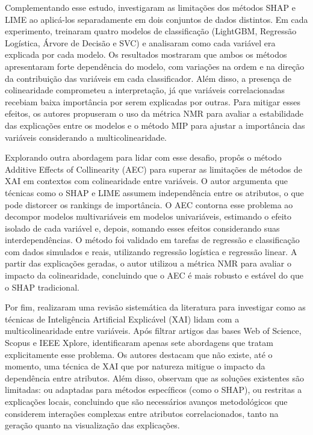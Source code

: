 Complementando esse estudo,  investigaram as limitações dos métodos SHAP e LIME ao aplicá-los separadamente em dois conjuntos de dados distintos. Em cada experimento, treinaram quatro modelos de classificação (LightGBM, Regressão Logística, Árvore de Decisão e SVC) e analisaram como cada variável era explicada por cada modelo. Os resultados mostraram que ambos os métodos apresentaram forte dependência do modelo, com variações na ordem e na direção da contribuição das variáveis em cada classificador. Além disso, a presença de colinearidade comprometeu a interpretação, já que variáveis correlacionadas recebiam baixa importância por serem explicadas por outras. Para mitigar esses efeitos, os autores propuseram o uso da métrica NMR para avaliar a estabilidade das explicações entre os modelos e o método MIP para ajustar a importância das variáveis considerando a multicolinearidade. 

Explorando outra abordagem para lidar com esse desafio,  propôs o método Additive Effects of Collinearity (AEC) para superar as limitações de métodos de XAI em contextos com colinearidade entre variáveis. O autor argumenta que técnicas como o SHAP e LIME assumem independência entre os atributos, o que pode distorcer os rankings de importância. O AEC contorna esse problema ao decompor modelos multivariáveis em modelos univariáveis, estimando o efeito isolado de cada variável e, depois, somando esses efeitos considerando suas interdependências. O método foi validado em tarefas de regressão e classificação com dados simulados e reais, utilizando regressão logística e regressão linear. A partir das explicações geradas, o autor utilizou a métrica NMR para avaliar o impacto da colinearidade, concluindo que o AEC é mais robusto e estável do que o SHAP tradicional.

Por fim,  realizaram uma revisão sistemática da literatura para investigar como as técnicas de Inteligência Artificial Explicável (XAI) lidam com a multicolinearidade entre variáveis. Após filtrar artigos das bases Web of Science, Scopus e IEEE Xplore, identificaram apenas sete abordagens que tratam explicitamente esse problema. Os autores destacam que não existe, até o momento, uma técnica de XAI que por natureza mitigue o impacto da dependência entre atributos. Além disso, observam que as soluções existentes são limitadas: ou adaptadas para métodos específicos (como o SHAP), ou restritas a explicações locais, concluindo que são necessários avanços metodológicos que considerem interações complexas entre atributos correlacionados, tanto na geração quanto na visualização das explicações.




